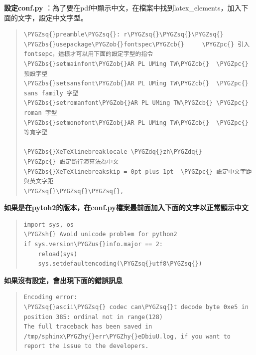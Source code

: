 \documentclass[letterpaper,10pt,english]{sphinxmanual}
\def\PYGZbs{\char`\\}
\def\PYGZus{\char`\_}
\def\PYGZob{\char`\{}
\def\PYGZcb{\char`\}}
\def\PYGZsh{\char`\#}
\def\PYGZpc{\char`\%}
\def\PYGZhy{\char`\-}
\def\PYGZsq{\char`\'}
\def\PYGZdq{\char`\"}
\begin{document}
\textbf{設定conf.py} ：為了要在pdf中顯示中文，在檔案中找到latex\_elements，加入下面的文字，設定中文字型。
\begin{quote}

\begin{Verbatim}[commandchars=\\\{\}]
\PYGZsq{}preamble\PYGZsq{}: r\PYGZsq{}\PYGZsq{}\PYGZsq{}
\PYGZbs{}usepackage\PYGZob{}fontspec\PYGZcb{}     \PYGZpc{} 引入 fontsepc，這樣才可以用下面的設定字型的指令
\PYGZbs{}setmainfont\PYGZob{}AR PL UMing TW\PYGZcb{}  \PYGZpc{} 預設字型
\PYGZbs{}setsansfont\PYGZob{}AR PL UMing TW\PYGZcb{}  \PYGZpc{} sans family 字型
\PYGZbs{}setromanfont\PYGZob{}AR PL UMing TW\PYGZcb{} \PYGZpc{} roman 字型
\PYGZbs{}setmonofont\PYGZob{}AR PL UMing TW\PYGZcb{}  \PYGZpc{} 等寬字型

\PYGZbs{}XeTeXlinebreaklocale \PYGZdq{}zh\PYGZdq{}          \PYGZpc{} 設定斷行演算法為中文
\PYGZbs{}XeTeXlinebreakskip = 0pt plus 1pt  \PYGZpc{} 設定中文字距與英文字距
\PYGZsq{}\PYGZsq{}\PYGZsq{},
\end{Verbatim}
\end{quote}

\textbf{如果是在pytoh2的版本，在conf.py檔案最前面加入下面的文字以正常顯示中文}
\begin{quote}

\begin{Verbatim}[commandchars=\\\{\}]
import sys, os
\PYGZsh{} Avoid unicode problem for python2
if sys.version\PYGZus{}info.major == 2:
    reload(sys)
    sys.setdefaultencoding(\PYGZsq{}utf8\PYGZsq{})
\end{Verbatim}
\end{quote}

\textbf{如果沒有設定，會出現下面的錯誤訊息}
\begin{quote}

\begin{Verbatim}[commandchars=\\\{\}]
Encoding error:
\PYGZsq{}ascii\PYGZsq{} codec can\PYGZsq{}t decode byte 0xe5 in position 385: ordinal not in range(128)
The full traceback has been saved in /tmp/sphinx\PYGZhy{}err\PYGZhy{}eDbiuU.log, if you want to report the issue to the developers.
\end{Verbatim}
\end{quote}
\end{document}
